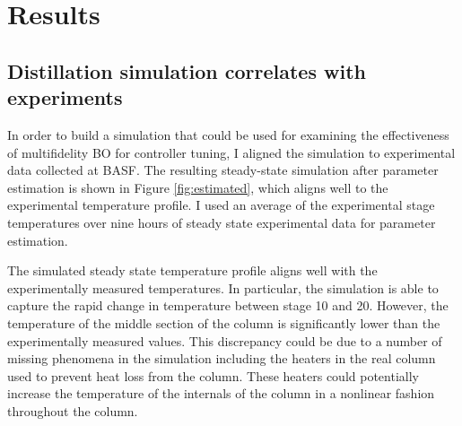\section{Results}

\subsection{Distillation simulation correlates with experiments}

In order to build a simulation that could be used for examining the effectiveness of multifidelity BO for controller tuning, I aligned the simulation to experimental data collected at BASF. The resulting steady-state simulation after parameter estimation is shown in Figure \ref{fig:estimated}, which aligns well to the experimental temperature profile. I used an average of the experimental stage temperatures over nine hours of steady state experimental data for parameter estimation. 

The simulated steady state temperature profile aligns well with the experimentally measured temperatures. In particular, the simulation is able to capture the rapid change in temperature between stage 10 and 20. However, the temperature of the middle section of the column is significantly lower than the experimentally measured values. This discrepancy could be due to a number of missing phenomena in the simulation including the heaters in the real column used to prevent heat loss from the column. These heaters could potentially increase the temperature of the internals of the column in a nonlinear fashion throughout the column. 

